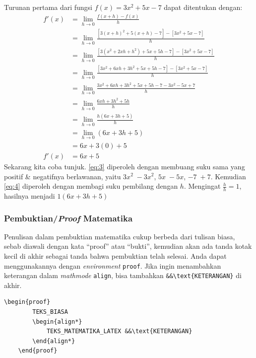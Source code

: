 \begin{enumerate}[label=\arabic*)]
    Turunan pertama dari fungsi $f(x) = 3x^2 + 5x − 7$ dapat ditentukan dengan:
    \begin{align}
        f'(x) &= \lim_{h \to 0} \frac{f(x+h) - f(x)}{h} \nonumber \\
        &= \lim_{h \to 0} \frac{[3(x+h)^2 + 5(x+h) - 7] - [3x^2 + 5x - 7]}{h} \nonumber \\
        &= \lim_{h \to 0} \frac{[3(x^2 + 2xh + h^2) + 5x + 5h - 7] - [3x^2 + 5x - 7]}{h} \nonumber \\
        &= \lim_{h \to 0} \frac{[3x^2 + 6xh + 3h^2 + 5x + 5h - 7] - [3x^2 + 5x - 7]}{h} \nonumber \\
        &= \lim_{h \to 0} \frac{3x^2 + 6xh + 3h^2 + 5x + 5h - 7 - 3x^2 - 5x + 7}{h} \nonumber \\
        &= \lim_{h \to 0} \frac{6xh + 3h^2 + 5h}{h} \label{eq:3} \\
        &= \lim_{h \to 0} \frac{h(6x + 3h + 5)}{h} \nonumber \\
        &= \lim_{h \to 0} (6x + 3h + 5) \label{eq:4} \\
        &= 6x + 3(0) + 5 \nonumber \\
        f'(x) &= 6x + 5 \nonumber
    \end{align}
    Sekarang kita coba tunjuk. \autoref{eq:3} diperoleh dengan membuang suku sama yang positif \& negatifnya berlawanan, yaitu $3x^2\; -3x^2$, $5x\; -5x$, $-7\; +7$. Kemudian \autoref{eq:4} diperoleh dengan membagi suku pembilang dengan $h$. Mengingat $\frac{h}{h} = 1$, hasilnya menjadi $1(6x + 3h + 5)$
\end{enumerate}

\subsubsection{Pembuktian/\textit{Proof} Matematika}

Penulisan dalam pembuktian matematika cukup berbeda dari tulisan biasa, sebab diawali dengan kata ``proof'' atau ``bukti'', kemudian akan ada tanda kotak kecil di akhir sebagai tanda bahwa pembuktian telah selesai. Anda dapat menggunakannya dengan \textit{environment} \texttt{proof}. Jika ingin menambahkan keterangan dalam \textit{mathmode} \texttt{align}, bisa tambahkan \verb|&&\text{KETERANGAN}| di akhir.

\begin{lstlisting}[]
    \begin{proof}
        TEKS_BIASA
        \begin{align*}
            TEKS_MATEMATIKA_LATEX &&\text{KETERANGAN}
        \end{align*}
    \end{proof}
\end{lstlisting}

